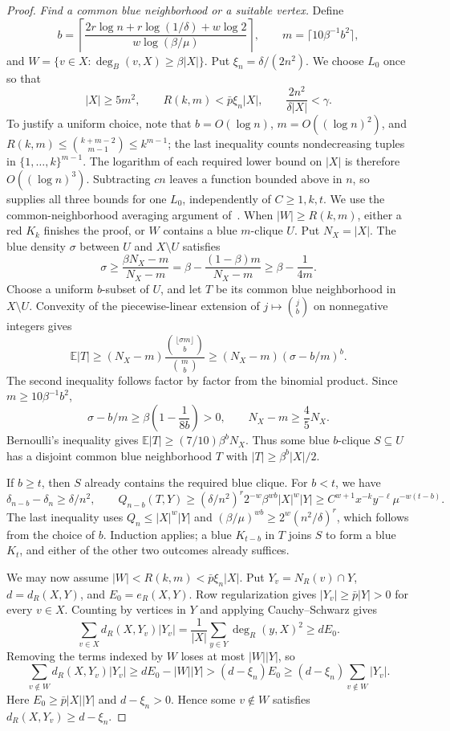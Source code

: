\documentclass[11pt]{article}
\theoremstyle{definition}
\begin{document}
\begin{proof}
\emph{Find a common blue neighborhood or a suitable vertex.}
Define
\[
 b=\left\lceil\frac{2r\log n+r\log(1/\delta)+w\log2}
 {w\log(\beta/\mu)}\right\rceil,
 \qquad m=\lceil10\beta^{-1}b^2\rceil,
\]
and \(W=\{v\in X:\deg_B(v,X)\ge\beta|X|\}\). Put \(\xi_n=\delta/(2n^2)\).
We choose \(L_0\) once so that
\[
 |X|\ge5m^2,\qquad
 R(k,m)<\bar p\xi_n|X|,\qquad
 \frac{2n^2}{\delta|X|}<\gamma.
\]
To justify a uniform choice, note that \(b=O(\log n)\), \(m=O((\log n)^2)\), and
\(R(k,m)\le\binom{k+m-2}{m-1}\le k^{m-1}\); the last inequality counts nondecreasing tuples in \(\{1,\ldots,k\}^{m-1}\).
The logarithm of each required lower bound on \(|X|\) is therefore \(O((\log n)^3)\).
Subtracting \(cn\) leaves a function bounded above in \(n\), so  supplies all three bounds for one \(L_0\), independently of \(C\ge1,k,t\).
We use the common-neighborhood averaging argument of~\cite[Lemma~9]{GNNW}.
When \(|W|\ge R(k,m)\), either a red \(K_k\) finishes the proof, or \(W\) contains a blue \(m\)-clique \(U\). Put \(N_X=|X|\). The blue density \(\sigma\) between \(U\) and \(X\setminus U\) satisfies
\[
 \sigma\ge\frac{\beta N_X-m}{N_X-m}
 =\beta-\frac{(1-\beta)m}{N_X-m}\ge\beta-\frac1{4m}.
\]
Choose a uniform \(b\)-subset of \(U\), and let $T$ be its common blue neighborhood in $X\setminus U$. Convexity of the piecewise-linear extension of \(j\mapsto\binom jb\) on nonnegative integers gives
\[
 \mathbb E|T|\ge(N_X-m)
 \frac{\binom{\lfloor\sigma m\rfloor}{b}}{\binom mb}
 \ge(N_X-m)(\sigma-b/m)^b.
\]
The second inequality follows factor by factor from the binomial product. Since \(m\ge10\beta^{-1}b^2\),
\[
 \sigma-b/m\ge\beta\left(1-\frac1{8b}\right)>0,
 \qquad N_X-m\ge\frac45N_X.
\]
Bernoulli's inequality gives \(\mathbb E|T|\ge(7/10)\beta^bN_X\). Thus some blue \(b\)-clique \(S\subseteq U\) has a disjoint common blue neighborhood \(T\) with \(|T|\ge\beta^b|X|/2\).

If $b\ge t$, then $S$ already contains the required blue clique. For $b<t$, we have
\[
 \delta_{n-b}-\delta_n\ge\delta/n^2,\qquad
 Q_{n-b}(T,Y)\ge(\delta/n^2)^r2^{-w}\beta^{wb}|X|^w|Y|
 \ge C^{w+1}x^{-k}y^{-\ell}\mu^{-w(t-b)}.
\]
The last inequality uses \(Q_n\le|X|^w|Y|\) and \((\beta/\mu)^{wb}\ge2^w(n^2/\delta)^r\), which follows from the choice of \(b\). Induction applies; a blue \(K_{t-b}\) in \(T\) joins \(S\) to form a blue \(K_t\), and either of the other two outcomes already suffices.

We may now assume \(|W|<R(k,m)<\bar p\xi_n|X|\). Put \(Y_v=N_R(v)\cap Y\), \(d=d_R(X,Y)\), and \(E_0=e_R(X,Y)\). Row regularization gives \(|Y_v|\ge\bar p|Y|>0\) for every \(v\in X\). Counting by vertices in \(Y\) and applying Cauchy--Schwarz gives
\[
 \sum_{v\in X}d_R(X,Y_v)|Y_v|
 =\frac1{|X|}\sum_{y\in Y}\deg_R(y,X)^2\ge dE_0.
\]
Removing the terms indexed by \(W\) loses at most \(|W||Y|\), so
\[
 \sum_{v\notin W}d_R(X,Y_v)|Y_v|
 \ge dE_0-|W||Y|
 >(d-\xi_n)E_0
 \ge(d-\xi_n)\sum_{v\notin W}|Y_v|.
\]
Here \(E_0\ge\bar p|X||Y|\) and \(d-\xi_n>0\). Hence some \(v\notin W\) satisfies \(d_R(X,Y_v)\ge d-\xi_n\).


\end{proof}
\end{document}
